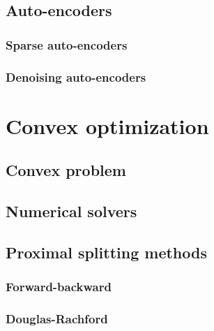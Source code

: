 \documentclass[a4paper,12pt,twoside]{report}
\begin{document}
\section{Auto-encoders}

\subsection{Sparse auto-encoders}

\subsection{Denoising auto-encoders}

\chapter{Convex optimization}

\section{Convex problem}

\section{Numerical solvers}

\section{Proximal splitting methods}

\subsection{Forward-backward}

\subsection{Douglas-Rachford}
\end{document}
